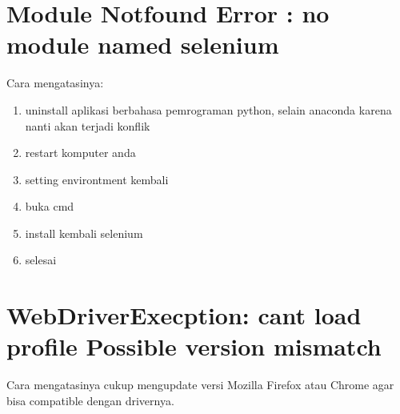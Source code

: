 \section{Module Notfound Error : no module named selenium}
Cara mengatasinya:
\begin{enumerate}
\item  uninstall aplikasi berbahasa pemrograman python, selain anaconda karena nanti akan terjadi konflik
\item restart komputer anda 
\item setting environtment kembali
\item buka cmd
\item install kembali selenium 
\item selesai
\end{enumerate} 

\section{ WebDriverExecption: cant load profile Possible version mismatch}
Cara mengatasinya cukup mengupdate versi Mozilla Firefox atau Chrome agar bisa compatible dengan drivernya.